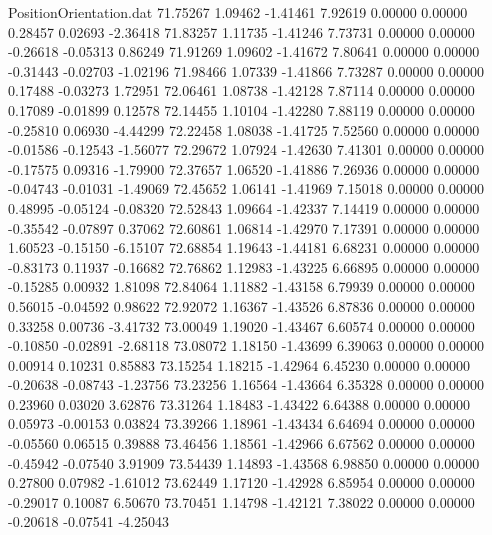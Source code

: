 \begin{filecontents}{PositionOrientation.dat}
  71.75267    1.09462   -1.41461     7.92619    0.00000    0.00000    0.28457    0.02693   -2.36418
  71.83257    1.11735   -1.41246     7.73731    0.00000    0.00000   -0.26618   -0.05313    0.86249
  71.91269    1.09602   -1.41672     7.80641    0.00000    0.00000   -0.31443   -0.02703   -1.02196
  71.98466    1.07339   -1.41866     7.73287    0.00000    0.00000    0.17488   -0.03273    1.72951
  72.06461    1.08738   -1.42128     7.87114    0.00000    0.00000    0.17089   -0.01899    0.12578
  72.14455    1.10104   -1.42280     7.88119    0.00000    0.00000   -0.25810    0.06930   -4.44299
  72.22458    1.08038   -1.41725     7.52560    0.00000    0.00000   -0.01586   -0.12543   -1.56077
  72.29672    1.07924   -1.42630     7.41301    0.00000    0.00000   -0.17575    0.09316   -1.79900
  72.37657    1.06520   -1.41886     7.26936    0.00000    0.00000   -0.04743   -0.01031   -1.49069
  72.45652    1.06141   -1.41969     7.15018    0.00000    0.00000    0.48995   -0.05124   -0.08320
  72.52843    1.09664   -1.42337     7.14419    0.00000    0.00000   -0.35542   -0.07897    0.37062
  72.60861    1.06814   -1.42970     7.17391    0.00000    0.00000    1.60523   -0.15150   -6.15107
  72.68854    1.19643   -1.44181     6.68231    0.00000    0.00000   -0.83173    0.11937   -0.16682
  72.76862    1.12983   -1.43225     6.66895    0.00000    0.00000   -0.15285    0.00932    1.81098
  72.84064    1.11882   -1.43158     6.79939    0.00000    0.00000    0.56015   -0.04592    0.98622
  72.92072    1.16367   -1.43526     6.87836    0.00000    0.00000    0.33258    0.00736   -3.41732
  73.00049    1.19020   -1.43467     6.60574    0.00000    0.00000   -0.10850   -0.02891   -2.68118
  73.08072    1.18150   -1.43699     6.39063    0.00000    0.00000    0.00914    0.10231    0.85883
  73.15254    1.18215   -1.42964     6.45230    0.00000    0.00000   -0.20638   -0.08743   -1.23756
  73.23256    1.16564   -1.43664     6.35328    0.00000    0.00000    0.23960    0.03020    3.62876
  73.31264    1.18483   -1.43422     6.64388    0.00000    0.00000    0.05973   -0.00153    0.03824
  73.39266    1.18961   -1.43434     6.64694    0.00000    0.00000   -0.05560    0.06515    0.39888
  73.46456    1.18561   -1.42966     6.67562    0.00000    0.00000   -0.45942   -0.07540    3.91909
  73.54439    1.14893   -1.43568     6.98850    0.00000    0.00000    0.27800    0.07982   -1.61012
  73.62449    1.17120   -1.42928     6.85954    0.00000    0.00000   -0.29017    0.10087    6.50670
  73.70451    1.14798   -1.42121     7.38022    0.00000    0.00000   -0.20618   -0.07541   -4.25043

\end{filecontents}
